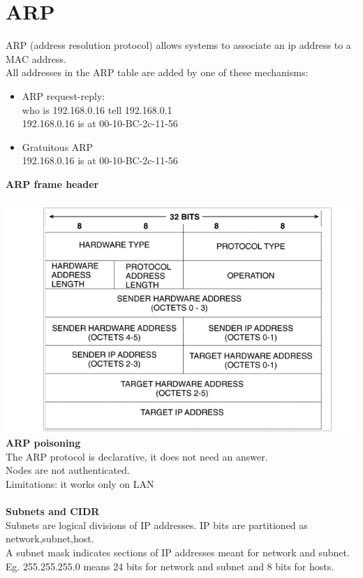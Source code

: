 \documentclass[10pt,a4paper]{book}
\begin{document}
\section{ARP}
ARP (address resolution protocol) allows systems to associate an ip address to a MAC address.\\
All addresses in the ARP table are added by one of these mechanisms:
\begin{itemize}
\item ARP request-reply: \\
who is 192.168.0.16 tell 192.168.0.1\\
192.168.0.16 is at 00-10-BC-2c-11-56
\item Gratuitous ARP\\
192.168.0.16 is at 00-10-BC-2c-11-56
\end{itemize}
\textbf{ARP frame header}\\\\
\includegraphics[scale=0.6]{arp.png}\\
\textbf{ARP poisoning}\\
The ARP protocol is declarative, it does not need an answer.\\
Nodes are not authenticated.\\
Limitations: it works only on LAN\\\\
\newpage
\textbf{Subnets and CIDR}\\
Subnets are logical divisions of IP addresses. IP bits are partitioned as network,subnet,host.\\
A subnet mask indicates sections of IP addresses meant for network and subnet.\\
Eg. 255.255.255.0 means 24 bits for network and subnet and 8 bits for hosts.\\\\
\end{document}
